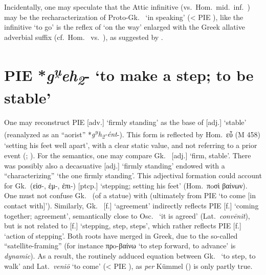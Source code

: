 \documentclass[output=paper,colorlinks,citecolor=brown]{langscibook}
\begin{document}
Incidentally, one may speculate that the Attic infinitive  (vs.\ Hom.\ mid.\ inf.\ ) may be the recharacterization of Proto-Gk.\  ‘in speaking’ (< PIE ), like the infinitive  ‘to go’ is the reflex of  ‘on the way’ enlarged with the Greek allative adverbial suffix  (cf.\ Hom.\  vs.\ ), as suggested by  \citet[323]{GarnierPinault2020}.

\section{PIE *\textit{g\textsuperscript{u̯}}\textit{eh\textsubscript{2}}- ‘to make a step; to be stable’}

One may reconstruct PIE  [adv.] ‘firmly standing’ as the base of  [adj.] ‘stable’ (reanalyzed as an “aorist”  *\textit{g\textsuperscript{u̯}h\textsubscript{2}-ént}-). This form is reflected by Hom.\ εὖ   (M 458) ‘setting his feet well apart’, with a clear static value, and not referring to a prior event (\citealt[133--135]{Letoublon1986}; \citealt[935]{Lamberterie1990}). For the semantics, one may compare Gk.\   [adj.] ‘firm, stable’. There was possibly also a decasuative  [adj.] ‘firmly standing’ endowed with a “characterizing”   ‘the one firmly standing’. This adjectival formation could account for Gk.\ (εἰσ-, ἐμ-, ἐπι-) [ptcp.] ‘stepping; setting his feet’ (Hom.\ πoσὶ βαίνων). One must not confuse Gk.\  (of a statue) with  (ultimately from PIE  ‘to come [in contact with]’). Similarly, Gk.\   [f.] ‘agreement’ indirectly reflects PIE  [f.] ‘coming together; agreement’, semantically close to Osc.\  ‘it is agreed’ (Lat.\ \textit{convēnit}), but is not related to   [f.] ‘stepping, step, steps’, which rather reflects PIE  [f.] ‘action of stepping’. Both roots have merged in Greek, due to the so-called “satellite-framing” (for instance πρo-βαίνω ‘to step forward, to advance’ is \textit{dynamic}). As a result, the routinely adduced equation between Gk.\  ‘to step, to walk’ and Lat.\ \textit{veniō} ‘to come’ (< PIE ), as \textit{per} Kümmel () is only partly true.
\end{document}
